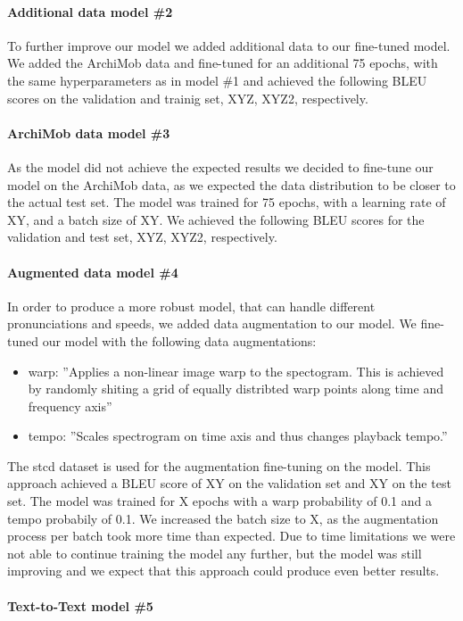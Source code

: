 \paragraph{Additional data model \#2} To further improve our  model we added additional data to our fine-tuned model. We added the ArchiMob data and fine-tuned for an additional 75 epochs, with
the same hyperparameters as in model \#1 and achieved the following BLEU scores on the validation and trainig set, XYZ, XYZ2, respectively.
\paragraph{ArchiMob data model \#3} As the  model did not achieve the expected results we decided to fine-tune our model on the ArchiMob data, as we expected the data distribution to be closer
to the actual test set. The model was trained for 75 epochs, with a learning rate of XY, and a batch size of XY. We achieved the following BLEU scores for the validation and test set, XYZ, XYZ2,
respectively.
\paragraph{Augmented data model \#4} In order to produce a more robust model, that can handle different pronunciations and speeds, we added data augmentation to our  model. We fine-tuned our
model with the following data augmentations:
\begin{itemize}
    \item warp: ''Applies a non-linear image warp to the spectogram. This is achieved by randomly shiting a grid of equally distribted warp points along time and frequency axis''
    \cite{DeepSpeechAugmentation}
    \item tempo: ''Scales spectrogram on time axis and thus changes playback tempo.'' \cite{DeepSpeechAugmentation}
\end{itemize}

The \gls{stcd} dataset is used for the augmentation fine-tuning on the  model. This approach achieved a BLEU score of XY on the validation set and XY on the test set. The model was trained for
X epochs with a warp probability of 0.1 and a tempo probabily of 0.1. We increased the batch size to X, as the augmentation process per batch took more time than expected. Due to time limitations we
were not able to continue training the model any further, but the model was still improving and we expect that this approach could produce even better results.
\paragraph{Text-to-Text model \#5}

